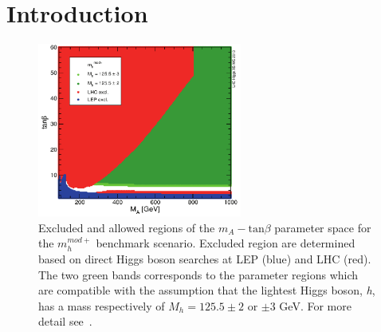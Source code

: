 %
%
%


\restoregeometry
\clearpage

\section{Introduction} \label{sec:intro}
\begin{figure}[tp]
     \begin{center}

            \includegraphics[width=0.6\textwidth]{figure/mh_mod.png}

    \end{center}
    \caption{Excluded and allowed regions of the $m_{A} - \text{tan}\beta$ parameter space for the  $m_{h}^{mod+}$ 
	benchmark scenario. Excluded region are determined based on direct Higgs boson searches at LEP (blue) and LHC (red). The two green 
	bands corresponds to the parameter regions which are compatible with the assumption that 
	the lightest Higgs boson, \emph{h}, has a mass respectively of $M_{h} = 125.5 \pm 2$ or $\pm 3$ GeV. For more detail 
	see~\cite{LHCxsec}.}
   \label{fig:mhmod}
\end{figure}

